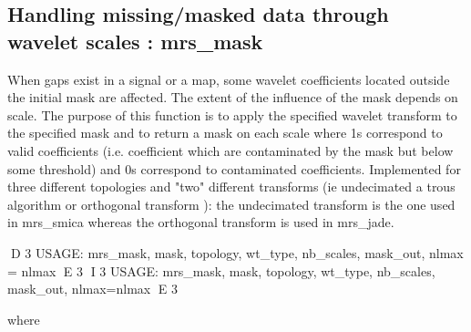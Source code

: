 \subsection{Handling missing/masked data through wavelet scales : mrs\_mask}
When gaps exist in a signal or a map, some wavelet coefficients located outside the initial mask are affected. The extent of 
the influence of the mask depends on scale. The purpose of this function is to apply the specified wavelet transform to the 
specified mask and to return a mask on each scale where 1s correspond to valid coefficients (i.e. coefficient which are 
contaminated by the mask but below some threshold) and 0s correspond to contaminated coefficients. Implemented for three 
different topologies and "two" different transforms (ie undecimated a trous algorithm or orthogonal transform ): the undecimated 
transform is the one used in mrs\_smica whereas the orthogonal transform is used in mrs\_jade.
{\bf
\begin{center}
D 3
     USAGE: mrs\_mask, mask, topology, wt\_type, nb\_scales, mask\_out, nlmax = nlmax
E 3
I 3
     USAGE: mrs\_mask, mask, topology, wt\_type, nb\_scales, mask\_out, nlmax=nlmax
E 3
\end{center}}
where
